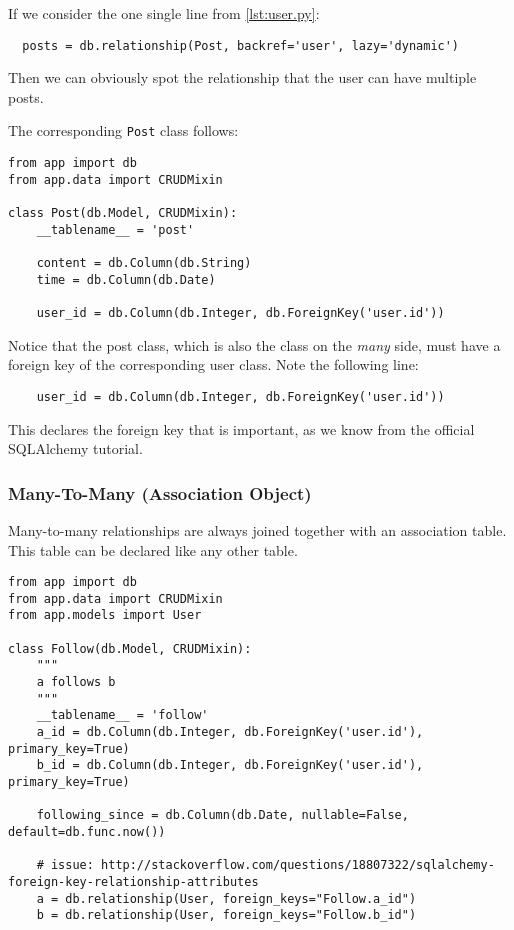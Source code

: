 \documentclass[../main/main.tex]{subfiles}
\begin{document}
If we consider the one single line from \ref{lst:user.py}:

\begin{lstlisting}
  posts = db.relationship(Post, backref='user', lazy='dynamic')  
\end{lstlisting}

Then we can obviously spot the relationship that the user can have
multiple posts. 

The corresponding \lstinline|Post| class follows: 

\begin{lstlisting}[caption=app/models/post.py, label=post.py]
from app import db
from app.data import CRUDMixin

class Post(db.Model, CRUDMixin):
    __tablename__ = 'post'

    content = db.Column(db.String)
    time = db.Column(db.Date)

    user_id = db.Column(db.Integer, db.ForeignKey('user.id'))
\end{lstlisting}

Notice that the post class, which is also the class on the
\textit{many} side, must have a foreign key of the corresponding user
class. Note the following line: 

\begin{lstlisting}
    user_id = db.Column(db.Integer, db.ForeignKey('user.id'))  
\end{lstlisting}

This declares the foreign key that is important, as we know from the
official SQLAlchemy tutorial. 


\subsubsection{Many-To-Many (Association Object)}
\label{sec:manytomany}

Many-to-many relationships are always joined together with an
association table. This table can be declared like any other table. 

\begin{lstlisting}
from app import db
from app.data import CRUDMixin
from app.models import User

class Follow(db.Model, CRUDMixin):
    """
    a follows b
    """
    __tablename__ = 'follow'
    a_id = db.Column(db.Integer, db.ForeignKey('user.id'), primary_key=True)
    b_id = db.Column(db.Integer, db.ForeignKey('user.id'), primary_key=True)

    following_since = db.Column(db.Date, nullable=False, default=db.func.now())

    # issue: http://stackoverflow.com/questions/18807322/sqlalchemy-foreign-key-relationship-attributes
    a = db.relationship(User, foreign_keys="Follow.a_id")
    b = db.relationship(User, foreign_keys="Follow.b_id")
\end{lstlisting}
\end{document}
